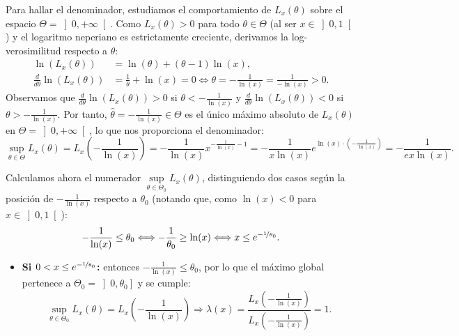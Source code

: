 \begin{ejercicio}
    Para hallar el denominador, estudiamos el comportamiento de $L_x(\theta)$ sobre el espacio $\Theta = \left]0, +\infty\right[$. Como $L_x(\theta) > 0$ para todo $\theta \in \Theta$ (al ser $x \in \left]0, 1\right[$) y el logaritmo neperiano es estrictamente creciente, derivamos la log-verosimilitud respecto a $\theta$:
    \begin{align*}
        \ln\left(L_x(\theta)\right) &= \ln(\theta) + (\theta - 1)\ln(x), \\
        \frac{d}{d\theta} \ln\left(L_x(\theta)\right) &= \frac{1}{\theta} + \ln(x) = 0 \Longleftrightarrow \theta = -\frac{1}{\ln(x)} = \frac{1}{-\ln(x)} > 0.
    \end{align*}
    Observamos que $\frac{d}{d\theta} \ln(L_x(\theta)) > 0$ si $\theta < -\frac{1}{\ln(x)}$ y $\frac{d}{d\theta} \ln(L_x(\theta)) < 0$ si $\theta > -\frac{1}{\ln(x)}$. Por tanto, $\widehat{\theta} = -\frac{1}{\ln(x)} \in \Theta$ es el único máximo absoluto de $L_x(\theta)$ en $\Theta = \left]0, +\infty\right[$, lo que nos proporciona el denominador:
    \begin{equation*}
        \sup\limits_{\theta \in \Theta} L_x(\theta) = L_x\left(-\frac{1}{\ln(x)}\right) = -\frac{1}{\ln(x)} x^{-\frac{1}{\ln(x)} - 1} = -\frac{1}{x\ln(x)} e^{\ln(x) \cdot \left(-\frac{1}{\ln(x)}\right)} = -\frac{1}{e x \ln(x)}.
    \end{equation*}

    Calculamos ahora el numerador $\sup\limits_{\theta \in \Theta_0} L_x(\theta)$, distinguiendo dos casos según la posición de $-\frac{1}{\ln(x)}$ respecto a $\theta_0$ (notando que, como $\ln(x) < 0$ para $x \in \left]0, 1\right[$):
    \begin{equation*}
        -\frac{1}{\ln(x)} \leq \theta_0 \Longleftrightarrow -\frac{1}{\theta_0} \geq \ln(x) \Longleftrightarrow x \leq e^{-\nicefrac{1}{\theta_0}}.
    \end{equation*}
    \begin{itemize}
        \item \textbf{Si $0 < x \leq e^{-\nicefrac{1}{\theta_0}}$:} entonces $-\frac{1}{\ln(x)} \leq \theta_0$, por lo que el máximo global pertenece a $\Theta_0 = \left]0, \theta_0\right]$ y se cumple:
        \begin{equation*}
            \sup\limits_{\theta \in \Theta_0} L_x(\theta) = L_x\left(-\frac{1}{\ln(x)}\right) \Longrightarrow \lambda(x) = \frac{L_x\left(-\frac{1}{\ln(x)}\right)}{L_x\left(-\frac{1}{\ln(x)}\right)} = 1.
        \end{equation*}


\end{itemize}
\end{ejercicio}
